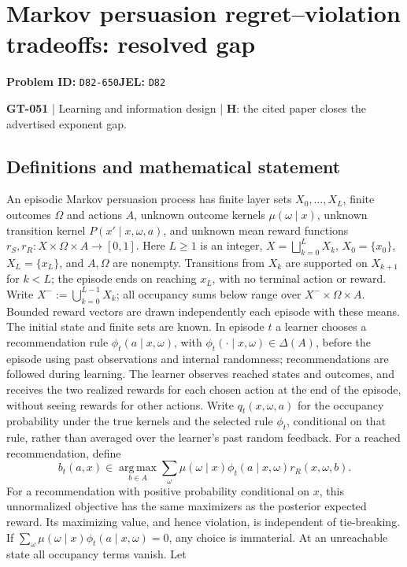 \documentclass[11pt,a4paper]{article}
\begin{document}
\section*{Markov persuasion regret--violation tradeoffs: resolved gap}
\textbf{Problem ID:} \texttt{D82-650}\quad \textbf{JEL:} \texttt{D82}\par
\label{problem:OP-0181}
\label{game:GT-051}
{\sffamily\small\color{muted}
\textbf{GT-051} | Learning and information design | \textbf{H}: the cited paper closes the advertised exponent gap.
\par}
\subsection*{Definitions and mathematical statement}
An episodic Markov persuasion process has finite layer sets $X_0,\ldots,X_L$, finite outcomes $\Omega$ and actions $A$, unknown outcome kernels $\mu(\omega\mid x)$, unknown transition kernel $P(x'\mid x,\omega,a)$, and unknown mean reward functions $r_S,r_R:X\times\Omega\times A\to[0,1]$. Here $L\geq1$ is an integer, $X=\bigsqcup_{k=0}^L X_k$, $X_0=\{x_0\}$, $X_L=\{x_L\}$, and $A,\Omega$ are nonempty. Transitions from $X_k$ are supported on $X_{k+1}$ for $k<L$; the episode ends on reaching $x_L$, with no terminal action or reward. Write $X^-:=\bigcup_{k=0}^{L-1}X_k$; all occupancy sums below range over $X^-\times\Omega\times A$. Bounded reward vectors are drawn independently each episode with these means. The initial state and finite sets are known. In episode $t$ a learner chooses a recommendation rule $\phi_t(a\mid x,\omega)$, with $\phi_t(\cdot\mid x,\omega)\in\Delta(A)$, before the episode using past observations and internal randomness; recommendations are followed during learning. The learner observes reached states and outcomes, and receives the two realized rewards for each chosen action at the end of the episode, without seeing rewards for other actions. Write $q_t(x,\omega,a)$ for the occupancy probability under the true kernels and the selected rule $\phi_t$, conditional on that rule, rather than averaged over the learner's past random feedback. For a reached recommendation, define
\[
 b_t(a,x)\in\operatorname*{arg\,max}_{b\in A}
 \sum_\omega\mu(\omega\mid x)\phi_t(a\mid x,\omega)r_R(x,\omega,b).
\]
For a recommendation with positive probability conditional on $x$, this unnormalized objective has the same maximizers as the posterior expected reward. Its maximizing value, and hence violation, is independent of tie-breaking. If $\sum_\omega\mu(\omega\mid x)\phi_t(a\mid x,\omega)=0$, any choice is immaterial. At an unreachable state all occupancy terms vanish. Let
\end{document}

